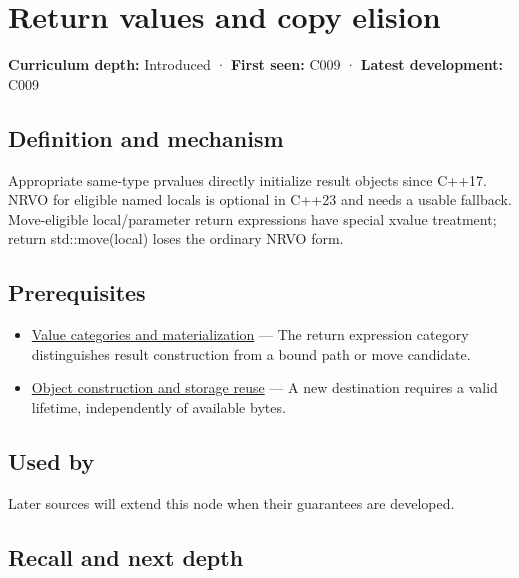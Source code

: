 \hypertarget{appendix-b08d3788c5c6}{}
\section{Return values and copy elision}\label{appendix-b08d3788c5c6-return-values-and-copy-elision}

\textbf{Curriculum depth:} Introduced · \textbf{First seen:} C009 · \textbf{Latest development:} C009

\subsection{Definition and mechanism}\label{appendix-b08d3788c5c6-definition-and-mechanism}

Appropriate same-type prvalues directly initialize result objects since C++17. NRVO for eligible named locals is optional in C++23 and needs a usable fallback. Move-eligible local/parameter return expressions have special xvalue treatment; return std::move(local) loses the ordinary NRVO form.

\subsection{Prerequisites}\label{appendix-b08d3788c5c6-prerequisites}

\begin{itemize}
\tightlist
\item
  \hyperref[appendix-1121b30eaeb0]{Value categories and materialization} --- The return expression category distinguishes result construction from a bound path or move candidate.
\item
  \hyperref[appendix-a82f9c438857]{Object construction and storage reuse} --- A new destination requires a valid lifetime, independently of available bytes.
\end{itemize}

\subsection{Used by}\label{appendix-b08d3788c5c6-used-by}

Later sources will extend this node when their guarantees are developed.

\subsection{Recall and next depth}\label{appendix-b08d3788c5c6-recall-and-next-depth}

